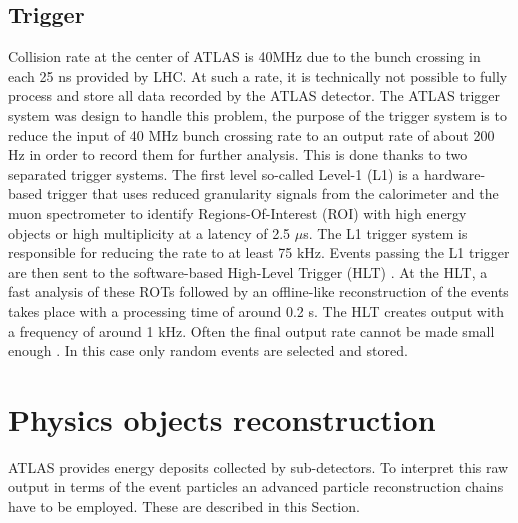 \subsection{Trigger}
\label{chap2:ATLAS:Trigger}
Collision rate at the center of ATLAS is 40MHz due to the bunch crossing in each 25 ns provided by LHC. At such a rate, it is technically not possible to fully process and store all data recorded by the ATLAS detector. The ATLAS trigger system was design to handle this problem, the purpose of the trigger system is to reduce the input of 40 MHz bunch crossing rate to an output rate of about 200 Hz in order to record them for further analysis. This is done thanks to two separated trigger systems. The first level so-called Level-1 (L1) \cite{Trigger_L1} is a hardware-based trigger that uses reduced granularity signals from the calorimeter and the muon spectrometer to identify Regions-Of-Interest (ROI) with high energy objects or high multiplicity at a latency of 2.5 $\mu$s. The L1 trigger system is responsible for reducing the rate to at least 75 kHz. Events passing the L1 trigger are then sent to the software-based High-Level Trigger (HLT) \cite{Trigger_HLT}. At the HLT, a fast analysis of these ROTs followed by an offline-like reconstruction of the events takes place with a processing time of around 0.2 s. The HLT creates output with a frequency of around 1 kHz. Often the final output rate cannot be made small enough \cite{DQ}. In this case only random events are selected and stored.
\section{Physics objects reconstruction}
\label{chap2:Objects}
ATLAS provides energy deposits collected by sub-detectors. To interpret this raw output in terms of the event particles an advanced particle reconstruction chains have to be employed. These are described in this Section.
